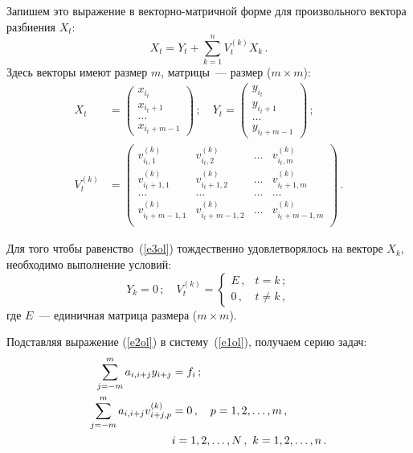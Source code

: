 \begin{multicols}{2}
     Запишем это выражение в векторно-матричной форме для
произвольного вектора разбиения $X_t$:
     \begin{equation}
     X_t = Y_t +\sum\limits_{k=1}^n V_t^{(k)} X_k\,.
     \label{e3ol}
     \end{equation}
     Здесь векторы имеют размер $m$, матрицы~--- размер ($m\times m$):
     \begin{align*}
     X_t &= \begin{pmatrix}
     x_{i_t}\\ x_{i_t+1}\\ \ldots\\ x_{i_t+m-1}
     \end{pmatrix}\,;\quad
     Y_t = \begin{pmatrix}
     y_{i_t}\\ y_{i_t+1}\\ \ldots\\ y_{i_t+m-1}
     \end{pmatrix}\,;\\[6pt]
     V_t^{(k)} & =
     \begin{pmatrix}
     v^{(k)}_{i_t,1} & v^{(k)}_{i_t,2} & \ldots & v^{(k)}_{i_t,m}\\
     v^{(k)}_{i_t+1,1} & v^{(k)}_{i_t+1,2} & \ldots & v^{(k)}_{i_t+1,m}\\
     \ldots & \ldots & \ldots & \ldots\\
     v^{(k)}_{i_t+m-1,1} & v^{(k)}_{i_t+m-1,2} & \ldots & v^{(k)}_{i_t+m-
1,m}\\
     \end{pmatrix}
     \,.
     \end{align*}
         
     Для того чтобы равенство~(\ref{e3ol}) тождественно %
      удов\-ле\-тво\-ря\-лось на
векторе $X_k$, необходимо выполнение условий:
     \begin{equation}
     Y_k = 0\,;\quad
     V_t^{(k)} =
     \begin{cases}
     E\,, & t=k\,;\\
     0\,, & t\not= k\,,
     \end{cases}
     \label{e4ol}
     \end{equation}
где     $E$~--- единичная матрица размера ($m\times m$).

     Подставляя выражение (\ref{e2ol}) в систему~(\ref{e1ol}), получаем
серию задач:
     \begin{align}
     \sum\limits_{j=-m}^m a_{i,i+j} y_{i+j} & = f_i\,;\notag\\
     \sum\limits_{j=-m}^m a_{i,i+j} v^{(k)}_{i+j,p} & = 0\,,\quad p=1, 2, \ldots ,
m\,,\label{e5ol}\\ &i=1, 2, \ldots , N\,,\ k=1, 2, \ldots , n\,.\notag
     \end{align}


\end{multicols}
